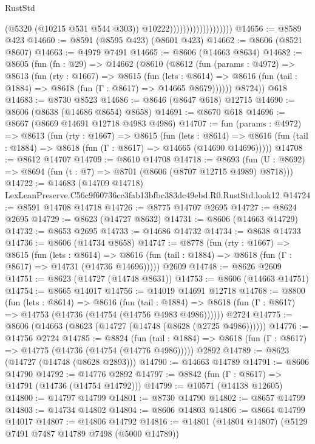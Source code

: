 \begin{lexlean}{RustStd}
\begin{coremodule}
                                          (@5320 (@10215 @531 @544 @303))
                                          @10222)))))))))))))))))))
@14656 := @8589 @423
@14660 := @8591 (@8595 @423) (@8601 @423)
@14662 := @8606 (@8521 @8607)
@14663 := @4979 @7491
@14665 := @8606 (@14663 @8634)
@14682 := @8605
    (fun (fn : @29) =>
    @14662
      (@8610
        (@8612
          (fun (params : @4972) =>
          @8613
            (fun (rty : @1667) =>
            @8615
              (fun (lets : @8614) =>
              @8616 (fun (tail : @1884) => @8618 (fun (Γ : @8617) => @14665 @8679))))))
        @8724))
    @618
@14683 := @8730 @8523
@14686 := @8646 (@8647 @618) @12715
@14690 := @8606 (@8638 (@14686 @8654) @8658)
@14691 := @8670 @618
@14696 := @8667 (@8669 @14691 @12718 @4983 @4986)
@14707 := fun (params : @4972) =>
  @8613
    (fun (rty : @1667) =>
    @8615
      (fun (lets : @8614) =>
      @8616 (fun (tail : @1884) => @8618 (fun (Γ : @8617) => @14665 (@14690 @14696)))))
@14708 := @8612 @14707
@14709 := @8610 @14708
@14718 := @8693
    (fun (U : @8692) => @8694 (fun (t : @7) => @8701 (@8606 (@8707 @12715 @4989) @8718)))
@14722 := @14683 (@14709 @14718) LexLeanPreserve.C56c9f60736cc3fab13bfbc383dc49ebd.R0.RustStd.look12
@14724 := @8591 @14708 @14718
@14726 := @8775 @14707 @2695
@14727 := @8624 @2695
@14729 := @8623 (@14727 @8632)
@14731 := @8606 (@14663 @14729)
@14732 := @8653 @2695
@14733 := @14686 @14732
@14734 := @8638 @14733
@14736 := @8606 (@14734 @8658)
@14747 := @8778
    (fun (rty : @1667) =>
    @8615
      (fun (lets : @8614) =>
      @8616 (fun (tail : @1884) => @8618 (fun (Γ : @8617) => @14731 (@14736 @14696)))))
    @2609
@14748 := @8626 @2609
@14751 := @8623 (@14727 (@14748 @8631))
@14753 := @8606 (@14663 @14751)
@14754 := @8665 @14017
@14756 := @14019 @14691 @12718
@14768 := @8800
    (fun (lets : @8614) =>
    @8616
      (fun (tail : @1884) =>
      @8618 (fun (Γ : @8617) => @14753 (@14736 (@14754 (@14756 @4983 @4986))))))
    @2724
@14775 := @8606 (@14663 (@8623 (@14727 (@14748 (@8628 (@2725 @4986))))))
@14776 := @14756 @2724
@14785 := @8824
    (fun (tail : @1884) => @8618 (fun (Γ : @8617) => @14775 (@14736 (@14754 (@14776 @4986)))))
    @2892
@14789 := @8623 (@14727 (@14748 (@8628 @2893)))
@14790 := @14663 @14789
@14791 := @8606 @14790
@14792 := @14776 @2892
@14797 := @8842 (fun (Γ : @8617) => @14791 (@14736 (@14754 @14792)))
@14799 := @10571 (@14138 @12605)
@14800 := @14797 @14799
@14801 := @8730 @14790
@14802 := @8657 @14799
@14803 := @14734 @14802
@14804 := @8606 @14803
@14806 := @8664 @14799 @14017
@14807 := @14806 @14792
@14816 := @14801 (@14804 @14807) (@5129 @7491 @7487 @14789 @7498 (@5000 @14789))

\end{coremodule}
\end{lexlean}
